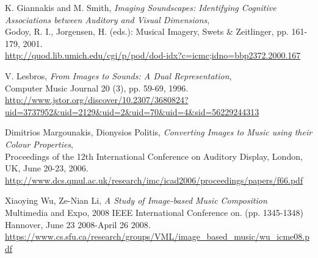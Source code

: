\begin{thebibliography}{9}
 K. Giannakis and M. Smith,
 \emph{Imaging Soundscapes: Identifying Cognitive Associations between Auditory and Visual Dimensions},\\
 Godoy, R. I., Jorgensen, H. (eds.): Musical Imagery, Swets \& Zeitlinger, pp. 161-179, 2001.\\
 \url{http://quod.lib.umich.edu/cgi/p/pod/dod-idx?c=icmc;idno=bbp2372.2000.167}

 V. Lesbros,
 \emph{From Images to Sounds: A Dual Representation},\\
 Computer Music Journal 20 (3), pp. 59-69, 1996.\\
 \url{http://www.jstor.org/discover/10.2307/3680824?uid=3737952&uid=2129&uid=2&uid=70&uid=4&sid=56229244313}

 Dimitrios Margounakis, Dionysios Politis,
 \emph{Converting Images to Music using their Colour Properties},\\ 
 Proceedings of the 12th International Conference on Auditory Display, London, UK, June 20-23, 2006.\\
 \url{http://www.dcs.qmul.ac.uk/research/imc/icad2006/proceedings/papers/f66.pdf}

 Xiaoying Wu, Ze-Nian Li,
 \emph{A Study of Image-based Music Composition}
 Multimedia and Expo, 2008 IEEE International Conference on. (pp. 1345-1348)\\
 Hannover, June 23 2008-April 26 2008.\\
 \url{https://www.cs.sfu.ca/research/groups/VML/image_based_music/wu_icme08.pdf}

\end{thebibliography}